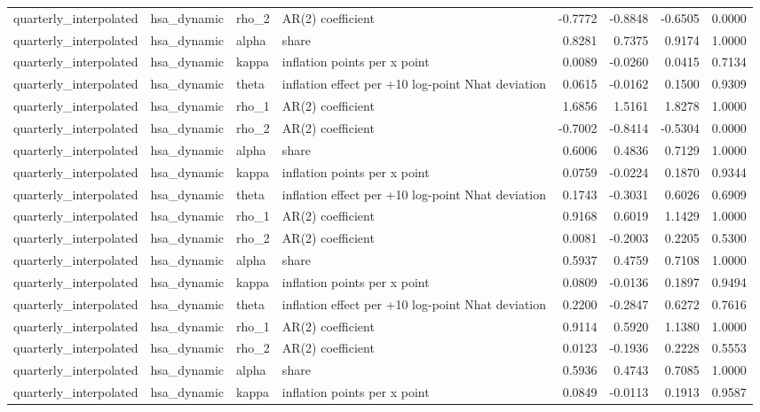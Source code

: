 \begin{tabular}{llllrrrr}
quarterly\_interpolated & hsa\_dynamic & rho\_2 & AR(2) coefficient & -0.7772 & -0.8848 & -0.6505 & 0.0000 \\
quarterly\_interpolated & hsa\_dynamic & alpha & share & 0.8281 & 0.7375 & 0.9174 & 1.0000 \\
quarterly\_interpolated & hsa\_dynamic & kappa & inflation points per x point & 0.0089 & -0.0260 & 0.0415 & 0.7134 \\
quarterly\_interpolated & hsa\_dynamic & theta & inflation effect per +10 log-point Nhat deviation & 0.0615 & -0.0162 & 0.1500 & 0.9309 \\
quarterly\_interpolated & hsa\_dynamic & rho\_1 & AR(2) coefficient & 1.6856 & 1.5161 & 1.8278 & 1.0000 \\
quarterly\_interpolated & hsa\_dynamic & rho\_2 & AR(2) coefficient & -0.7002 & -0.8414 & -0.5304 & 0.0000 \\
quarterly\_interpolated & hsa\_dynamic & alpha & share & 0.6006 & 0.4836 & 0.7129 & 1.0000 \\
quarterly\_interpolated & hsa\_dynamic & kappa & inflation points per x point & 0.0759 & -0.0224 & 0.1870 & 0.9344 \\
quarterly\_interpolated & hsa\_dynamic & theta & inflation effect per +10 log-point Nhat deviation & 0.1743 & -0.3031 & 0.6026 & 0.6909 \\
quarterly\_interpolated & hsa\_dynamic & rho\_1 & AR(2) coefficient & 0.9168 & 0.6019 & 1.1429 & 1.0000 \\
quarterly\_interpolated & hsa\_dynamic & rho\_2 & AR(2) coefficient & 0.0081 & -0.2003 & 0.2205 & 0.5300 \\
quarterly\_interpolated & hsa\_dynamic & alpha & share & 0.5937 & 0.4759 & 0.7108 & 1.0000 \\
quarterly\_interpolated & hsa\_dynamic & kappa & inflation points per x point & 0.0809 & -0.0136 & 0.1897 & 0.9494 \\
quarterly\_interpolated & hsa\_dynamic & theta & inflation effect per +10 log-point Nhat deviation & 0.2200 & -0.2847 & 0.6272 & 0.7616 \\
quarterly\_interpolated & hsa\_dynamic & rho\_1 & AR(2) coefficient & 0.9114 & 0.5920 & 1.1380 & 1.0000 \\
quarterly\_interpolated & hsa\_dynamic & rho\_2 & AR(2) coefficient & 0.0123 & -0.1936 & 0.2228 & 0.5553 \\
quarterly\_interpolated & hsa\_dynamic & alpha & share & 0.5936 & 0.4743 & 0.7085 & 1.0000 \\
quarterly\_interpolated & hsa\_dynamic & kappa & inflation points per x point & 0.0849 & -0.0113 & 0.1913 & 0.9587 \\

\end{tabular}
